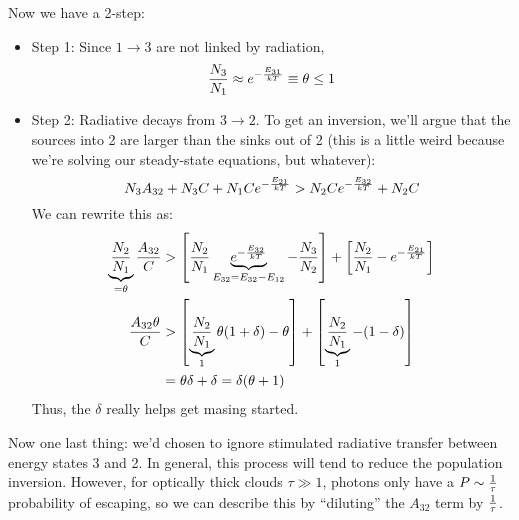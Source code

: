 \documentclass[11pt]{article}
\def\inv#1{{1 \over #1}}
\begin{document}
Now we have a 2-step:
\begin{itemize}\item Step 1: Since $1\to3$ are not linked by radiation,
$${N_3\over N_1}\approx e^{-{E_{31}\over kT}}\equiv\theta\le1$$
\item Step 2: Radiative decays from $3\to2$.  To get an inversion, we'll
argue that the sources into 2 are larger than the sinks out of 2 (this is 
a little weird because we're solving our steady-state equations, but whatever):
$$N_3A_{32}+N_3C+N_1Ce^{-{E_{21}\over kT}}>N_2Ce^{-{E_{32}\over kT}}+N_2C$$
We can rewrite this as:
$$\begin{aligned}
\underbrace{N_2\over N_1}_{=\theta}{A_{32}\over C}&>\left[{N_2\over N_1}
\underbrace{e^{-{E_{32}\over kT}}}_{E_{32}=E_{32}-E_{12}}-{N_3\over N_2}\right]
+\left[{N_2\over N_1}-e^{-{E_{21}\over kT}}\right]\\ 
{A_{32}\theta\over C}&>\left[\underbrace{N_2\over N_1}_{1}\theta(1+\delta)-
\theta\right]+\left[\underbrace{N_2\over N_1}_{1}-(1-\delta)\right]\\ 
&=\theta\delta+\delta=\delta(\theta+1)\\ \end{aligned}$$
Thus, the $\delta$ really helps get masing started.  
\end{itemize}
Now one last thing: we'd
chosen to ignore stimulated radiative transfer between energy states 3 and 2.
In general, this process
will tend to reduce the population inversion.  However, for optically thick
clouds $\tau\gg1$, photons only have a $P\sim\inv{\tau}$ probability of escaping,
so we can describe this by ``diluting'' the $A_{32}$ term by $\inv{\tau}$.
\end{document}
